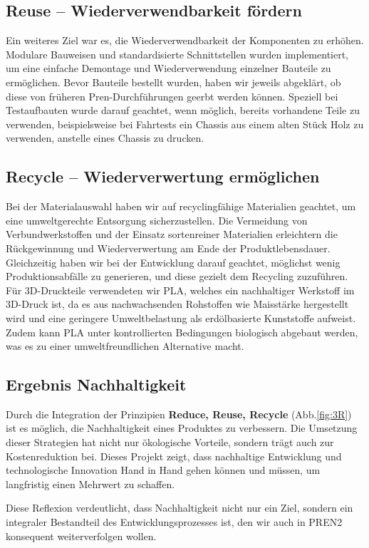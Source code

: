 \documentclass[../main.tex]{subfiles}
\begin{document}
\subsection{Reuse – Wiederverwendbarkeit fördern}

Ein weiteres Ziel war es, die Wiederverwendbarkeit der Komponenten zu erhöhen. Modulare Bauweisen und standardisierte Schnittstellen wurden implementiert, um eine einfache Demontage und Wiederverwendung einzelner Bauteile zu ermöglichen. Bevor Bauteile bestellt wurden, haben wir jeweils abgeklärt, ob diese von früheren Pren-Durchführungen geerbt werden können. Speziell bei Testaufbauten wurde darauf geachtet, wenn möglich, bereits vorhandene Teile zu verwenden, beispielsweise bei Fahrtests ein Chassis aus einem alten Stück Holz zu verwenden, anstelle eines Chassis zu drucken.

\subsection{Recycle – Wiederverwertung ermöglichen}

Bei der Materialauswahl haben wir auf recyclingfähige Materialien geachtet, um eine umweltgerechte Entsorgung sicherzustellen. Die Vermeidung von Verbundwerkstoffen und der Einsatz sortenreiner Materialien erleichtern die Rückgewinnung und Wiederverwertung am Ende der Produktlebensdauer. Gleichzeitig haben wir bei der Entwicklung darauf geachtet, möglichst wenig Produktionsabfälle zu generieren, und diese gezielt dem Recycling zuzuführen. Für 3D-Druckteile verwendeten wir PLA, welches ein nachhaltiger Werkstoff im 3D-Druck ist, da es aus nachwachsenden Rohstoffen wie Maisstärke hergestellt wird und eine geringere Umweltbelastung als erdölbasierte Kunststoffe aufweist. Zudem kann PLA unter kontrollierten Bedingungen biologisch abgebaut werden, was es zu einer umweltfreundlichen Alternative macht.

\subsection{Ergebnis Nachhaltigkeit}

Durch die Integration der Prinzipien \textbf{Reduce, Reuse, Recycle} (Abb.\ref{fig:3R}) ist es möglich, die Nachhaltigkeit eines Produktes zu verbessern. Die Umsetzung dieser Strategien hat nicht nur ökologische Vorteile, sondern trägt auch zur Kostenreduktion bei. Dieses Projekt zeigt, dass nachhaltige Entwicklung und technologische Innovation Hand in Hand gehen können und müssen, um langfristig einen Mehrwert zu schaffen.

Diese Reflexion verdeutlicht, dass Nachhaltigkeit nicht nur ein Ziel, sondern ein integraler Bestandteil des Entwicklungsprozesses ist, den wir auch in PREN2 konsequent weiterverfolgen wollen.
\end{document}

